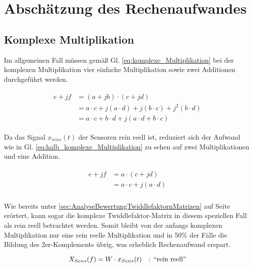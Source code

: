 \section{Abschätzung des Rechenaufwandes}\label{sec:abschaetzung_Rechenaufwand}
\subsection{Komplexe Multiplikation}

Im allgemeinen Fall müssen gemäß Gl. \ref{eq:komplexe_Multiplikation} bei der komplexen Multiplikation vier einfache Multiplikation sowie zwei Additionen durchgeführt werden.

\begin{align}\label{eq:komplexe_Multiplikation}
\begin{split}
 e + jf &= (a + jb) \cdot (c + jd)\\
        &= a \cdot c + j(a \cdot d) + j(b \cdot c) + j^2(b \cdot d)\\
        &= a \cdot c + b \cdot d + j(a \cdot d + b \cdot c)
\end{split}
\end{align}


Da das Signal $x_{sens}(t)$ der Sensoren rein reell ist, reduziert sich der Aufwand wie in Gl. \ref{eq:halb_komplexe_Multiplikation} zu sehen auf zwei Multiplikationen und eine Addition.

\begin{align}\label{eq:halb_komplexe_Multiplikation}
\begin{split}
 e + jf &= a \cdot (c + jd)\\
        &= a \cdot c + j(a \cdot d)\\
\end{split}
\end{align}

Wie bereits unter \ref{sec:AnalyseBewertungTwiddlefaktornMatrizen} auf Seite \pageref{sec:AnalyseBewertungTwiddlefaktornMatrizen} erörtert, kann sogar die komplexe 
Twiddlefaktor-Matrix in diesem speziellen Fall als rein reell betrachtet werden. Somit bleibt von der anfangs komplexen Multiplikation nur eine rein reelle Multiplikation und
in 50$\percent$ der Fälle die Bildung des 2er-Komplements übrig, was erheblich Rechenaufwand erspart.

\begin{equation}
 X_{Sens}(f) = W \cdot x_{Sens}(t) \quad \textnormal{: ``rein reell''}
\end{equation}
  

